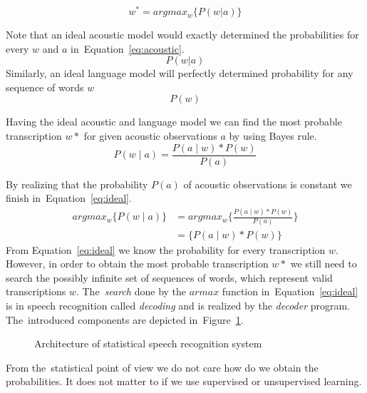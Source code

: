 \begin{equation}\label{eq:asr}
    w^* = argmax_{w}\{P(w|a)\} 
\end{equation}

Note that an ideal acoustic model would exactly determined the probabilities for every $w$ and $a$ in~Equation~\ref{eq:acoustic}.
\begin{equation}\label{eq:acoustic}
    P(w|a)
\end{equation}
Similarly, an ideal language model will perfectly determined probability for any sequence of words $w$
\begin{equation}
    P(w)
\end{equation}

Having the ideal acoustic and language model we can find the most probable transcription $w*$ for given acoustic observations $a$ by using Bayes rule.
\begin{equation}
    P(w \mid a) = \frac{P(a \mid w) * P(w)}{P(a)}
\end{equation}

By realizing that the probability $P(a)$ of acoustic observations is constant we finish in~Equation~\ref{eq:ideal}.
\begin{align}\label{eq:ideal}
    argmax_w\{P(w \mid a)\} &= argmax_w \{\frac{P(a \mid w) * P(w)}{P(a)}\}\\
                            &= \{P(a \mid w) * P(w)\}
\end{align}
From Equation~\ref{eq:ideal} we know the probability for every transcription $w$. However, in order to obtain the most probable transcription $w*$ we still need to search the possibly infinite set of sequences of words, which represent valid transcriptions $w$. The~{\it search}\/ done by the $armax$ function in~Equation~\ref{eq:ideal} is in speech recognition called {\it decoding}\/ and is realized by the {\it decoder}\/ program. The~introduced components are depicted in~Figure~\ref{fig:components}.
\begin{figure}[!htp]
    \begin{center}
    
    \caption{Architecture of statistical speech recognition system\cite{ney1990acoustic} }
    \label{fig:components} 
    \end{center}
\end{figure}



From the~statistical point of view we do not care how do we obtain the probabilities.
It does not matter to if we use supervised or unsupervised learning. 

